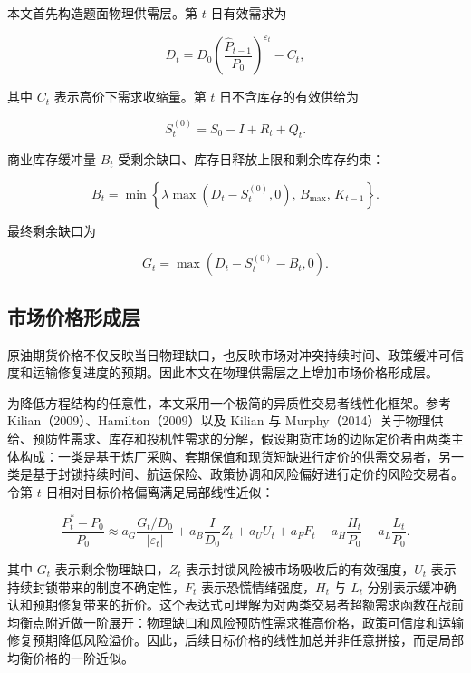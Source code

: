 本文首先构造题面物理供需层。第 $t$ 日有效需求为

\begin{equation}
  D_t
  =
  D_0\left(\frac{\hat P_{t-1}}{P_0}\right)^{\varepsilon_t}
  - C_t,
\end{equation}

其中 $C_t$ 表示高价下需求收缩量。第 $t$ 日不含库存的有效供给为

\begin{equation}
  S_t^{(0)}
  =
  S_0 - I + R_t + Q_t.
\end{equation}

商业库存缓冲量 $B_t$ 受剩余缺口、库存日释放上限和剩余库存约束：

\begin{equation}
  B_t
  =
  \min\left\{
    \lambda \max(D_t-S_t^{(0)},0),\,
    B_{\max},\,
    K_{t-1}
  \right\}.
\end{equation}

最终剩余缺口为

\begin{equation}
  G_t = \max(D_t-S_t^{(0)}-B_t,0).
\end{equation}

\subsection{市场价格形成层}

原油期货价格不仅反映当日物理缺口，也反映市场对冲突持续时间、政策缓冲可信度和运输修复进度的预期。因此本文在物理供需层之上增加市场价格形成层。

为降低方程结构的任意性，本文采用一个极简的异质性交易者线性化框架。参考 Kilian（2009）、Hamilton（2009）以及 Kilian 与 Murphy（2014）关于物理供给、预防性需求、库存和投机性需求的分解，假设期货市场的边际定价者由两类主体构成：一类是基于炼厂采购、套期保值和现货短缺进行定价的供需交易者，另一类是基于封锁持续时间、航运保险、政策协调和风险偏好进行定价的风险交易者。令第 \(t\) 日相对目标价格偏离满足局部线性近似：

\begin{equation}
  \frac{P_t^\ast-P_0}{P_0}
  \approx
  a_G\frac{G_t/D_0}{|\varepsilon_t|}
  +a_B\frac{I}{D_0}Z_t
  +a_U U_t
  +a_F F_t
  -a_H\frac{H_t}{P_0}
  -a_L\frac{L_t}{P_0}.
\end{equation}

其中 \(G_t\) 表示剩余物理缺口，\(Z_t\) 表示封锁风险被市场吸收后的有效强度，\(U_t\) 表示持续封锁带来的制度不确定性，\(F_t\) 表示恐慌情绪强度，\(H_t\) 与 \(L_t\) 分别表示缓冲确认和预期修复带来的折价。这个表达式可理解为对两类交易者超额需求函数在战前均衡点附近做一阶展开：物理缺口和风险预防性需求推高价格，政策可信度和运输修复预期降低风险溢价。因此，后续目标价格的线性加总并非任意拼接，而是局部均衡价格的一阶近似。

